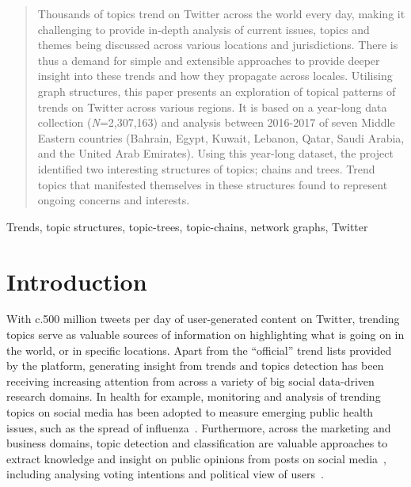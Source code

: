 \documentclass[conference]{IEEEtran}
\begin{document}
\begin{abstract}
Thousands of topics trend on Twitter across the world every day,
making it challenging to provide in-depth analysis of current issues,
topics and themes being discussed across various locations and
jurisdictions. There is thus a demand for simple and extensible
approaches to provide deeper insight into these trends and how they
propagate across locales. Utilising graph structures, this paper
presents an exploration of topical patterns of trends on Twitter
across various regions. It is based on a year-long data collection
({\emph{N}}=2,307,163) and analysis between 2016-2017 of seven Middle
Eastern countries (Bahrain, Egypt, Kuwait, Lebanon, Qatar, Saudi
Arabia, and the United Arab Emirates). Using this year-long dataset,
the project identified two interesting structures of topics; chains
and trees. Trend topics that manifested themselves in these structures
found to represent ongoing concerns and interests.
\end{abstract}

\begin{IEEEkeywords}
Trends, topic structures, topic-trees, topic-chains, network graphs, Twitter
\end{IEEEkeywords}

\section{Introduction}\label{intro}

With c.500 million tweets per day of user-generated content on
Twitter, trending topics serve as valuable sources of information on
highlighting what is going on in the world, or in specific
locations. Apart from the ``official'' trend lists provided by the
platform, generating insight from trends and topics detection has been
receiving increasing attention from across a variety of big social
data-driven research domains. In health for example, monitoring and
analysis of trending topics on social media has been adopted to
measure emerging public health issues, such as the spread of
influenza~\cite{Achrekar2011,Parker2015}. Furthermore, across the
marketing and business domains, topic detection and classification are
valuable approaches to extract knowledge and insight on public
opinions from posts on social
media~\cite{blamey-et-al-2012,blamey-et-al-2013,Bello2013,albishry-et-al:ssei2018},
including analysing voting intentions and political view of
users~\cite{Fang2015}.
\end{document}
